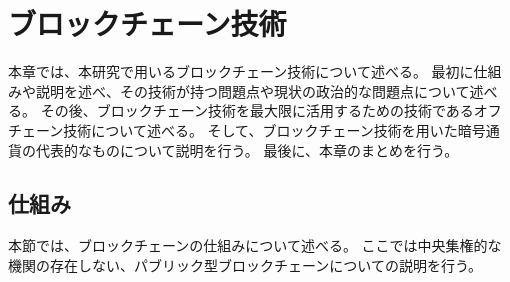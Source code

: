 \chapter{ブロックチェーン技術}
本章では、本研究で用いるブロックチェーン技術について述べる。
最初に仕組みや説明を述べ、その技術が持つ問題点や現状の政治的な問題点について述べる。
その後、ブロックチェーン技術を最大限に活用するための技術であるオフチェーン技術について述べる。
そして、ブロックチェーン技術を用いた暗号通貨の代表的なものについて説明を行う。
最後に、本章のまとめを行う。

\section{仕組み}
本節では、ブロックチェーンの仕組みについて述べる。
ここでは中央集権的な機関の存在しない、パブリック型ブロックチェーンについての説明を行う。

